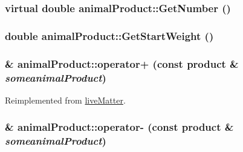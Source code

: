 \label{classanimal_product_a95a133a9ad5921133cf2fd42b2d88835}
\hypertarget{classanimal_product_a398f9c68eb23f28d14d5a365eebd091a}{
\subsubsection[{GetNumber}]{\setlength{\rightskip}{0pt plus 5cm}virtual double animalProduct::GetNumber ()}}
\label{classanimal_product_a398f9c68eb23f28d14d5a365eebd091a}
\hypertarget{classanimal_product_a8232ade0a8ba3fb2f94704f934d163d9}{
\subsubsection[{GetStartWeight}]{\setlength{\rightskip}{0pt plus 5cm}double animalProduct::GetStartWeight ()}}
\label{classanimal_product_a8232ade0a8ba3fb2f94704f934d163d9}
\hypertarget{classanimal_product_a80febd49f670e55f887240f7c1f65662}{
\subsubsection[{operator+}]{ \& animalProduct::operator+ (const {\bf product} \& {\em someanimalProduct})}}
\label{classanimal_product_a80febd49f670e55f887240f7c1f65662}


Reimplemented from \hyperlink{classlive_matter_ae7a333e94f166a448a4b8f8b70ebe9fe}{liveMatter}.\hypertarget{classanimal_product_ad7c934680a4e21b36ff1fb8626d4621e}{
\subsubsection[{operator-\/}]{ \& animalProduct::operator-\/ (const {\bf product} \& {\em someanimalProduct})}}
\label{classanimal_product_ad7c934680a4e21b36ff1fb8626d4621e}


